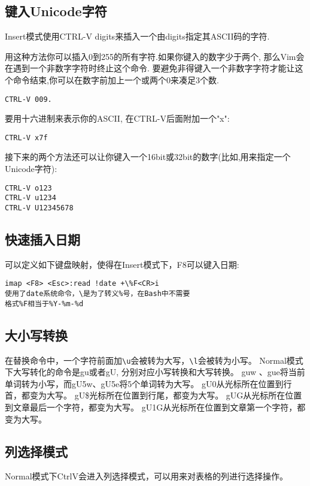 \subsection{键入Unicode字符}
Insert模式使用CTRL-V {digits}来插入一个由{digits}指定其ASCII码的字符. 

用这种方法你可以插入0到255的所有字符.如果你键入的数字少于两个, 那么Vim会在遇到一个非数字字符时终止这个命令. 要避免非得键入一个非数字字符才能让这个命令结束,你可以在数字前加上一个或两个0来凑足3个数.

\begin{verbatim}
CTRL-V 009.
\end{verbatim}

要用十六进制来表示你的ASCII, 在CTRL-V后面附加一个"x":
\begin{verbatim}
CTRL-V x7f
\end{verbatim}

接下来的两个方法还可以让你键入一个16bit或32bit的数字(比如,用来指定一个Unicode字符):
\begin{verbatim}
CTRL-V o123
CTRL-V u1234
CTRL-V U12345678
\end{verbatim}

\subsection{快速插入日期}
可以定义如下键盘映射，使得在Insert模式下，F8可以键入日期:
\begin{verbatim}
imap <F8> <Esc>:read !date +\%F<CR>i
使用了date系统命令，\是为了转义%号，在Bash中不需要
格式%F相当于%Y-%m-%d
\end{verbatim}

\subsection{大小写转换}
在替换命令中，一个字符前面加\verb+\u+会被转为大写，\verb+\l+会被转为小写。
Normal模式下大写转化的命令是gu或者gU, 分别对应小写转换和大写转换。
guw 、gue将当前单词转为小写，而gU5w、gU5e将5个单词转为大写。
gU0从光标所在位置到行首，都变为大写。
gU\$光标所在位置到行尾，都变为大写。
gUG从光标所在位置到文章最后一个字符，都变为大写。
gU1G从光标所在位置到文章第一个字符，都变为大写。


\subsection{列选择模式}
Normal模式下CtrlV会进入列选择模式，可以用来对表格的列进行选择操作。


